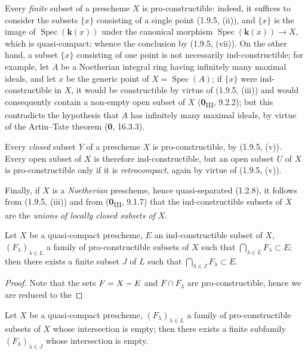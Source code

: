 \begin{examples}[1.9.6]
\label{IV.1.9.6}
Every \emph{finite} subset of a prescheme $X$
is pro-constructible: indeed, it suffices to consider the subsets
$\{x\}$ consisting of a single point (1.9.5, (ii)), and $\{x\}$ is the image
of $\operatorname{Spec}(\boldsymbol{k}(x))$ under the canonical morphism
$\operatorname{Spec}(\boldsymbol{k}(x))\to X$, which is quasi-compact; whence the
conclusion by (1.9.5, (vii)). On the other hand, a subset $\{x\}$ consisting
of one point is not necessarily ind-constructible; for example, let $A$ be a
Noetherian integral ring having infinitely many maximal ideals, and let $x$
be the generic point of $X=\operatorname{Spec}(A)$; if $\{x\}$ were
ind-constructible in $X$, it would be constructible by virtue of (1.9.5,
(iii)) and would consequently contain a non-empty open subset of $X$
(\textbf{0}\textsubscript{III}, 9.2.2); but this contradicts the hypothesis that $A$
has infinitely many maximal ideals, by virtue of the Artin--Tate theorem
(\textbf{0}, 16.3.3).

Every \emph{closed} subset $Y$ of a prescheme $X$ is pro-constructible, by
(1.9.5, (v)). Every open subset of $X$ is therefore ind-constructible, but
an open subset $U$ of $X$ is pro-constructible only if it is
\emph{retrocompact}, again by virtue of (1.9.5, (v)).

Finally, if $X$ is a \emph{Noetherian} prescheme, hence quasi-separated
(1.2.8), it follows from (1.9.5, (iii)) and from (\textbf{0}\textsubscript{III}, 9.1.7)
that the ind-constructible subsets of $X$ are the \emph{unions of locally
closed subsets of $X$}.
\end{examples}

\begin{theorem}[1.9.7]
\label{IV.1.9.7}
Let $X$ be a quasi-compact prescheme, $E$ an ind-constructible subset of
$X$, $(F_\lambda)_{\lambda\in L}$ a family of pro-constructible subsets
of $X$ such that $\bigcap_{\lambda\in L}F_\lambda\subset E$; then there
exists a finite subset $J$ of $L$ such that
$\bigcap_{\lambda\in J}F_\lambda\subset E$.
\end{theorem}

\begin{proof}
Note that the sets $F=X- E$ and $F\cap F_\lambda$ are
pro-constructible, hence we are reduced to the
\end{proof}

\begin{corollary}[1.9.8]
\label{IV.1.9.8}
Let $X$ be a quasi-compact prescheme, $(F_\lambda)_{\lambda\in L}$ a
family of pro-constructible subsets of $X$ whose intersection is empty;
then there exists a finite subfamily $(F_\lambda)_{\lambda\in J}$ whose
intersection is empty.
\end{corollary}

